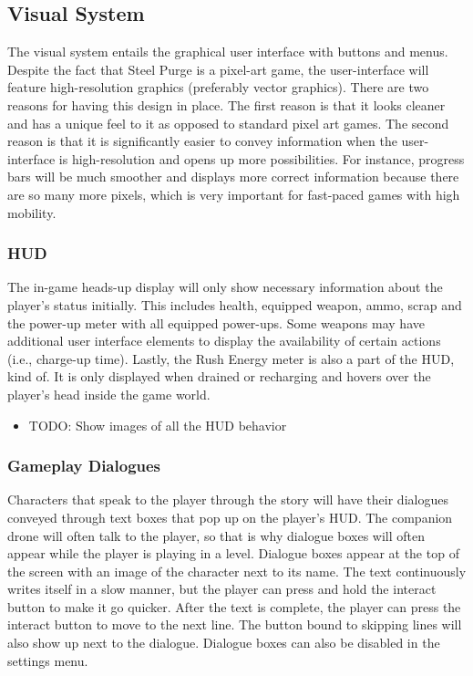 \documentclass[12pt]{article}
\begin{document}
\subsection{Visual System}

The visual system entails the graphical user interface with buttons and menus. Despite the fact that Steel Purge is a pixel-art game, the user-interface will feature high-resolution graphics (preferably vector graphics). There are two reasons for having this design in place. The first reason is that it looks cleaner and has a unique feel to it as opposed to standard pixel art games. The second reason is that it is significantly easier to convey information when the user-interface is high-resolution and opens up more possibilities. For instance, progress bars will be much smoother and displays more correct information because there are so many more pixels, which is very important for fast-paced games with high mobility. 

\subsubsection{HUD}

The in-game heads-up display will only show necessary information about the player's status initially. This includes health, equipped weapon, ammo, scrap and the power-up meter with all equipped power-ups. Some weapons may have additional user interface elements to display the availability of certain actions (i.e., charge-up time). Lastly, the Rush Energy meter is also a part of the HUD, kind of. It is only displayed when drained or recharging and hovers over the player's head inside the game world. 

\begin{itemize}
	\item TODO: Show images of all the HUD behavior
\end{itemize}

\subsubsection{Gameplay Dialogues}

Characters that speak to the player through the story will have their dialogues conveyed through text boxes that pop up on the player's HUD. The companion drone will often talk to the player, so that is why dialogue boxes will often appear while the player is playing in a level. Dialogue boxes appear at the top of the screen with an image of the character next to its name. The text continuously writes itself in a slow manner, but the player can press and hold the interact button to make it go quicker. After the text is complete, the player can press the interact button to move to the next line. The button bound to skipping lines will also show up next to the dialogue. Dialogue boxes can also be disabled in the settings menu. 
\end{document}
